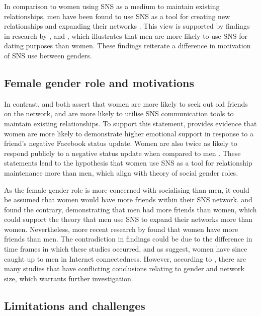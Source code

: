 In comparison to women using SNS as a medium to maintain existing relationships, men have been found to use SNS as a tool for creating new relationships and expanding their networks \citep{Mazman2011}. This view is supported by findings in research by \citet{Muscanell2012}, \citet{Raacke2008} and \citet{Haferkamp2012}, which illustrates that men are more likely to use SNS for dating purposes than women. These findings reiterate a difference in motivation of SNS use between genders. 

\subsection{Female gender role and motivations}

In contrast, \citet{Mazman2011} and \citet{Muscanell2012} both assert that women are more likely to seek out old friends on the network, and are more likely to utilise SNS communication tools to maintain existing relationships. To support this statement, \citet{Joiner2014} provides evidence that women are more likely to demonstrate higher emotional support in response to a friend's negative Facebook status update. Women are also twice as likely to respond publicly to a negative status update when compared to men \citep[p. 167]{Joiner2014}. These statements lend to the hypothesis that women use SNS as a tool for relationship maintenance more than men, which align with  theory of social gender roles.

As the female gender role is more concerned with socialising than men, it could be assumed that women would have more friends within their SNS network. \citet{Raacke2008} and \citet{Fogel2009} found the contrary, demonstrating that men had more friends than women, which could support the theory that men use SNS to expand their networks more than women. Nevertheless, more recent research by \citet{McAndrew2012} found that women have more friends than men. The contradiction in findings could be due to the difference in time frames in which these studies occurred, and as \citet{Fallows2005} suggest, women have since caught up to men in Internet connectedness. However, according to \citet[p. 389]{Tifferet2014}, there are many studies that have conflicting conclusions relating to gender and network size, which warrants further investigation.

\subsection{Limitations and challenges}

